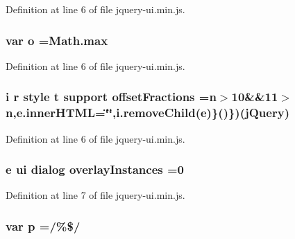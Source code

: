 {{Definition at line 6 of file jquery-\/ui.\+min.\+js.

\subsubsection[{\texorpdfstring{o}{o}}]{\setlength{\rightskip}{0pt plus 5cm}var o ={\bf Math.\+max}}\hypertarget{jquery-ui_8min_8js_a400dc8109620963da8314d4bdfa14f83}{}\label{jquery-ui_8min_8js_a400dc8109620963da8314d4bdfa14f83}


Definition at line 6 of file jquery-\/ui.\+min.\+js.

\subsubsection[{\texorpdfstring{offset\+Fractions}{offsetFractions}}]{ {\bf i} {\bf r} style {\bf t} support offset\+Fractions ={\bf n}$>$10\&\&11$>${\bf n},e.\+inner\+H\+T\+ML=\char`\"{}\char`\"{},i.\+remove\+Child({\bf e})\}()\})({\bf j\+Query})}\hypertarget{jquery-ui_8min_8js_a594b772a0e6cd1258328ad4fa6e62424}{}\label{jquery-ui_8min_8js_a594b772a0e6cd1258328ad4fa6e62424}


Definition at line 6 of file jquery-\/ui.\+min.\+js.

\subsubsection[{\texorpdfstring{overlay\+Instances}{overlayInstances}}]{ {\bf e} {\bf ui} dialog overlay\+Instances =0}\hypertarget{jquery-ui_8min_8js_a3b0ed5dffa46ffa1b33c1607bb887ad3}{}\label{jquery-ui_8min_8js_a3b0ed5dffa46ffa1b33c1607bb887ad3}


Definition at line 7 of file jquery-\/ui.\+min.\+js.

\subsubsection[{\texorpdfstring{p}{p}}]{\setlength{\rightskip}{0pt plus 5cm}var p =/\%\$/}\hypertarget{jquery-ui_8min_8js_ad1707b001240e9c8298830073364c8bf}{}\label{jquery-ui_8min_8js_ad1707b001240e9c8298830073364c8bf}


}}
